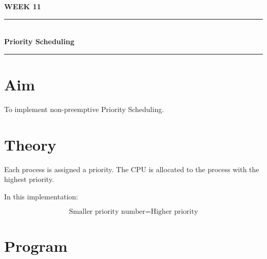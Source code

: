 \documentclass[12pt,a4paper]{report}
\newcommand{\experimenttitle}[2]{
\clearpage
\begin{center}
{\Large\bfseries\color{univblue} WEEK #1}\\[0.15cm]
\rule{\textwidth}{1pt}\\[0.2cm]
{\LARGE\bfseries #2}\\[0.2cm]
\rule{\textwidth}{1pt}
\end{center}
\vspace{0.4cm}
}
\begin{document}
\experimenttitle{11}{Priority Scheduling}

\section*{Aim}

To implement non-preemptive Priority Scheduling.

\section*{Theory}

Each process is assigned a priority. The CPU is allocated to the process with
the highest priority.

In this implementation:

\[
\text{Smaller priority number} =
\text{Higher priority}
\]

\section*{Program}
\end{document}
